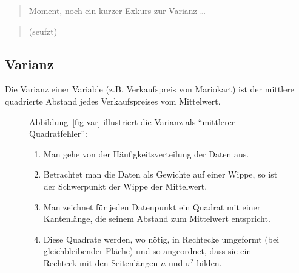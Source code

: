 \documentclass[
  letterpaper,
  twoside,
  open=any]{scrbook}
\providecommand{\tightlist}{%
  \setlength{\itemsep}{0pt}\setlength{\parskip}{0pt}}\usepackage{longtable,booktabs,array}
\theoremstyle{definition}
\theoremstyle{definition}
\theoremstyle{definition}
\theoremstyle{remark}
\begin{document}
\begin{quote}
{} Moment, noch ein kurzer Exkurs zur Varianz \ldots{}
\end{quote}

\begin{quote}
{} (seufzt)
\end{quote}

\subsection{Varianz}\label{varianz}

Die Varianz einer Variable (z.B. Verkaufspreis von Mariokart) ist der
mittlere quadrierte Abstand jedes Verkaufspreises vom Mittelwert.

\begin{figure}

\begin{minipage}{0.60\linewidth}
Abbildung~\ref{fig-var} illustriert die Varianz als \enquote{mittlerer
Quadratfehler}:

\begin{enumerate}
\def\labelenumi{\arabic{enumi}.}
\tightlist
\item
  Man gehe von der Häufigkeitsverteilung der Daten aus.
\item
  Betrachtet man die Daten als Gewichte auf einer Wippe, so ist der
  Schwerpunkt der Wippe der Mittelwert.
\item
  Man zeichnet für jeden Datenpunkt ein Quadrat mit einer Kantenlänge,
  die seinem Abstand zum Mittelwert entspricht.
\item
  Diese Quadrate werden, wo nötig, in Rechtecke umgeformt (bei
  gleichbleibender Fläche) und so angeordnet, dass sie ein Rechteck mit
  den Seitenlängen \(n\) und \(\sigma^2\) bilden.
\end{enumerate}

\end{minipage}%
%
\begin{minipage}{0.40\linewidth}

\begin{figure}[H]

\centering{

}
\end{figure}
\end{minipage}
\end{figure}
\end{document}
